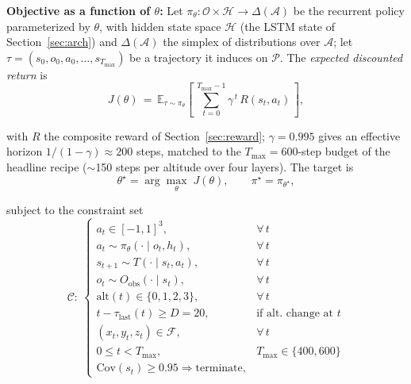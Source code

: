 \documentclass[conference]{IEEEtran}
\begin{document}
\noindent\textbf{Objective as a function of $\theta$:} Let $\pi_\theta\!:\!\mathcal{O}\!\times\!\mathcal{H}\!\to\!\Delta(\mathcal{A})$ be the recurrent policy parameterized by $\theta$, with hidden state space $\mathcal{H}$ (the LSTM state of Section~\ref{sec:arch}) and $\Delta(\mathcal{A})$ the simplex of distributions over $\mathcal{A}$; let $\tau\!=\!(s_0,o_0,a_0,\ldots,s_{T_{\max}})$ be a trajectory it induces on $\mathcal{P}$. The \emph{expected discounted return} is
\vspace{-2pt}
\begin{equation}
J(\theta) \,=\, \mathbb{E}_{\tau\sim\pi_\theta}\!\left[\,\sum_{t=0}^{T_{\max}-1}\gamma^{\,t}\, R(s_t,a_t)\,\right],
\label{eq:J}
\end{equation}
\vspace{-4pt}

\noindent with $R$ the composite reward of Section~\ref{sec:reward}; $\gamma\!=\!0.995$ gives an effective horizon $1/(1-\gamma)\!\approx\!200$ steps, matched to the $T_{\max}\!=\!600$-step budget of the headline recipe ($\sim$150 steps per altitude over four layers). The target is
\vspace{-2pt}
\begin{equation}
\theta^{\star} = \arg\max_{\theta}\; J(\theta),\qquad \pi^{\star} = \pi_{\theta^{\star}},
\label{eq:pi_star}
\end{equation}
\vspace{-4pt}

\noindent subject to the constraint set
\vspace{-4pt}
{\renewcommand{\arraystretch}{0.80}%
\begin{equation}
\mathcal{C}:\
\begin{cases}
a_t \in [-1,1]^3, & \forall\, t \\
a_t \sim \pi_\theta(\cdot\!\mid\!o_t,h_t), & \forall\, t \\
s_{t+1} \sim T(\cdot\!\mid\!s_t,a_t), & \forall\, t \\
o_t \sim O_{\text{obs}}(\cdot\!\mid\!s_t), & \forall\, t \\
\mathrm{alt}(t) \in \{0,1,2,3\}, & \forall\, t \\
t - \tau_{\text{last}}(t) \geq D = 20, & \text{if alt.\ change at } t \\
(x_t, y_t, z_t) \in \mathcal{F}, & \forall\, t \\
0 \leq t < T_{\max}, & T_{\max}\!\in\!\{400,600\} \\
\mathrm{Cov}(s_t)\!\geq\!0.95 \Rightarrow \text{terminate}, &
\end{cases}
\label{eq:constraints}
\end{equation}}%
\vspace{-4pt}
\end{document}
